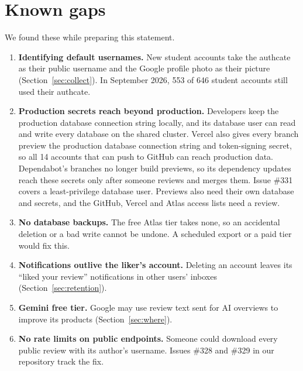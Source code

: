 \documentclass[11pt,a4paper]{article}
\begin{document}
\section{Known gaps}
\label{sec:gaps}

We found these while preparing this statement.

\begin{enumerate}
  \item \textbf{Identifying default usernames.}  New student accounts take
    the authcate as their public username and the Google profile photo as
    their picture (Section~\ref{sec:collect}).  In September 2026, 553 of
    646 student accounts still used their authcate.
  \item \textbf{Production secrets reach beyond production.}  Developers
    keep the production database connection string locally, and its database
    user can read and write every database on the shared cluster.  Vercel
    also gives every branch preview the production database connection
    string and token-signing secret, so all 14 accounts that can push to
    GitHub can reach production data.  Dependabot's branches no longer build
    previews, so its dependency updates reach these secrets only after
    someone reviews and merges them.  Issue \#331 covers a least-privilege
    database user.  Previews also need their own database and secrets, and the
    GitHub, Vercel and Atlas access lists need a review.
  \item \textbf{No database backups.}  The free Atlas tier takes none, so an
    accidental deletion or a bad write cannot be undone.  A scheduled export
    or a paid tier would fix this.
  \item \textbf{Notifications outlive the liker's account.}  Deleting an
    account leaves its ``liked your review'' notifications in other users'
    inboxes (Section~\ref{sec:retention}).
  \item \textbf{Gemini free tier.}  Google may use review text sent for AI
    overviews to improve its products (Section~\ref{sec:where}).
  \item \textbf{No rate limits on public endpoints.}  Someone could download
    every public review with its author's username.  Issues \#328 and \#329
    in our repository track the fix.
\end{enumerate}
\end{document}
